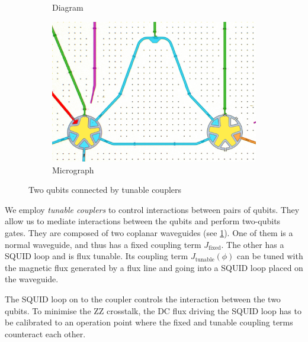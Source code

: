 \begin{figure}[b]
    \centering
    \begin{subfigure}{0.65\textwidth}
        \centering
        
        \vspace{-1cm}
        \caption{Diagram}
        \label{fig:tun_coupl}
    \end{subfigure}
    \hspace{0.3cm}
    \begin{subfigure}{0.25\textwidth}
        \centering
        \includegraphics[width=\textwidth]{Images/Chap1/tun_couplers.png} 
        \caption{Micrograph}
        \label{fig:tun_coupl_real}
    \end{subfigure}
    \caption{Two qubits connected by tunable couplers}
    \label{fig:tun_coupl_tot}
\end{figure}

We employ \emph{tunable couplers} \cite{tun_coupler, HernandezAnton2023} to control interactions between pairs of qubits.
They allow us to mediate interactions between the qubits and perform two-qubits gates.
They are composed of two coplanar waveguides (see \cref{fig:tun_coupl}).
One of them is a normal waveguide, and thus has a fixed coupling term $J_\text{fixed}$.
The other has a SQUID loop and is flux tunable.
Its coupling term $J_\text{tunable}(\phi)$ can be tuned with the magnetic flux generated by a flux line and going into a SQUID loop placed on the waveguide.

The SQUID loop on to the coupler controls the interaction between the two qubits. 
To minimise the ZZ crosstalk, the DC flux driving the SQUID loop has to be calibrated to an operation point where the fixed and tunable coupling terms counteract each other.

